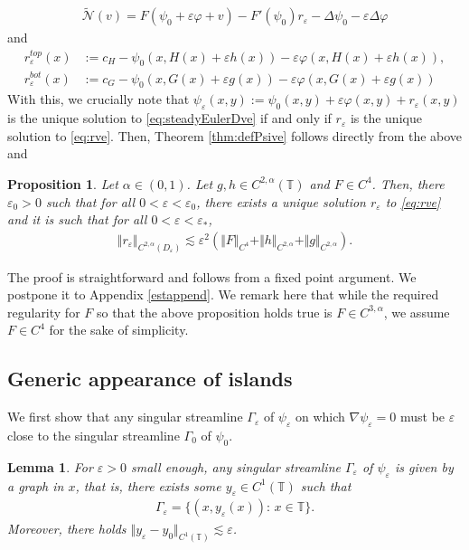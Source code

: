 \documentclass[11pt,reqno]{amsproc}
\newtheorem{proposition}{Proposition}[section]
\newcommand{\N}{\mathcal{N}}
\newcommand{\ve}{\varepsilon}
\numberwithin{equation}{section}
\numberwithin{theorem}{section}
\numberwithin{prop}{section}
\numberwithin{cor}{section}
\newtheorem{lemma}{Lemma}
\numberwithin{lemma}{section}
\theoremstyle{remark}
\theoremstyle{definition}
\begin{document}
\begin{align*}
\widetilde{\N}(v) = F(\psi_0 + \ve\varphi + v) - F'(\psi_0)r_\ve -\Delta\psi_0 - \ve\Delta \varphi
\end{align*}
and
\begin{align*}
r_\ve^{top}(x)&:= c_H-  \psi_0(x,H(x)+\ve h(x)) - \ve  \varphi(x,H(x)+\ve h(x)), \\
r_\ve^{bot}(x)&:= c_G-  \psi_0(x,G(x)+\ve g(x))- \ve\varphi(x,G(x)+\ve g(x)) 
\end{align*}
With this, we crucially note that $\psi_\ve(x,y):=\psi_0(x,y) + \ve\varphi(x,y) + r_\ve(x,y)$ is the unique solution to \eqref{eq:steadyEulerDve} if and only if $r_\ve$ is the unique solution to \eqref{eq:rve}. Then, Theorem \ref{thm:defPsive} follows directly from the above and
\begin{proposition}\label{prop:boundsrve}
Let $\alpha\in (0,1)$. Let $g,h\in C^{2,\alpha}(\mathbb{T})$ and $F\in C^4$. Then, there $\ve_0>0$ such that for all $0<\ve < \ve_0$, there exists a unique solution $r_\ve$ to \eqref{eq:rve} and it is such that for all $0 < \ve < \ve_*$,
\begin{align*}
\Vert r_\ve \Vert_{C^{2,\alpha}(D_\ve)} \lesssim \ve^2 \left( \Vert F \Vert_{C^4} + \Vert h \Vert_{C^{2,\alpha}} + \Vert g \Vert_{C^{2,\alpha}} \right).
\end{align*}
\end{proposition} 
The proof is straightforward and follows from a fixed point argument. We postpone it to Appendix \ref{estappend}. We remark here that while the required regularity for $F$ so that the above proposition holds true is $F\in C^{3,\alpha}$, we assume $F\in C^4$ for the sake of simplicity.

\subsection{Generic appearance of islands}

We first
show that any singular streamline $\Gamma_\ve$ of $\psi_\ve$ on which $\nabla \psi_\ve = 0$ must be $\ve$ close to the singular streamline $\Gamma_0$ of $\psi_0$. 

\begin{lemma}\label{lemma:ApproxGammave}
For $\ve>0$ small enough, any singular streamline $\Gamma_\ve$ of $\psi_\ve$ is given by a graph in $x$, that is, there exists some $y_\ve\in C^1(\mathbb{T})$ such that
\begin{align*}
\Gamma_\ve = \lbrace (x,y_\ve(x)): \, x\in \mathbb{T} \rbrace.
\end{align*}
Moreover, there holds $\Vert y_\ve - y_0 \Vert_{C^1(\mathbb{T})}\lesssim \ve$.
\end{lemma}
\end{document}
